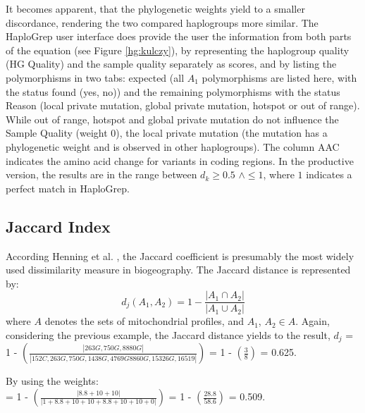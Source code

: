 It becomes apparent, that the phylogenetic weights yield to a smaller discordance, rendering the two compared haplogroups more similar. The HaploGrep user interface does provide the user the information from both parts of the equation (see Figure \ref{hg:kulczy}), by representing the haplogroup quality (HG Quality) and the sample quality separately as scores, and by listing the polymorphisms in two tabs: expected (all $A_1$ polymorphisms are listed here, with the status found (yes, no)) and the remaining polymorphisms with the status Reason (local private mutation, global private mutation, hotspot or out of range). While out of range, hotspot and global private mutation do not influence the Sample Quality (weight 0), the local private mutation (the mutation has a phylogenetic weight and is observed in other haplogroups). The column AAC indicates the amino acid change for variants in coding regions.  
In the productive version, the results are in the range between $d_k \geq 0.5 $ $ \wedge \leq 1$, where $1$ indicates a perfect match in HaploGrep.

\subsection{Jaccard Index}
According Henning et al. \cite{Hennig2006}, the Jaccard coefficient \cite{Jaccard1901} is presumably the most widely used dissimilarity measure in biogeography. The Jaccard distance is represented by:
\begin{equation}
d_j (A_1, A_2) = 1 -  \frac{\left|A_1  \cap A_2\right| }{\left|A_1 \cup A_2\right|} 
\end{equation}
where $A$ denotes the sets of mitochondrial profiles, and $A_1$, $A_2 \in A$. Again, considering the previous example, the Jaccard distance yields to the result, $d_j$ =
1 - $\left(  \frac{\left| 263G, 750G, 8880G \right|}{\left| 152C, 263G, 750G, 1438G, 4769G 8860G,15326G, 16519 \right|}  \right)$  = 
1 -  $\left(  \frac{3}{8} \right)$ = 0.625. 

By using the weights: \\
= 1 - $\left(  \frac{\left| 8.8 + 10 + 10 \right|}{\left| 1 + 8.8 + 10 + 10 + 8.8 + 10 + 10  + 0 \right|}  \right)$  = 1 -  $\left(  \frac{28.8}{58.6} \right)$ = 0.509. 
